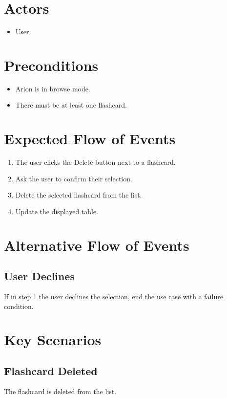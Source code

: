 \documentclass{scrreprt}
\begin{document}
\section{Actors}
\begin{itemize}
    \item User
\end{itemize}

\section{Preconditions}
\begin{itemize}
    \item Arion is in browse mode.
    \item There must be at least one flashcard.
\end{itemize}

\section{Expected Flow of Events}
\begin{enumerate}[1.]
    \item The user clicks the Delete button next to a flashcard.
    \item Ask the user to confirm their selection.
    \item Delete the selected flashcard from the list.
    \item Update the displayed table.
\end{enumerate}

\section{Alternative Flow of Events}

    \subsection{User Declines}
    If in step 1 the user declines the selection,
    end the use case with a failure condition.

\section{Key Scenarios}
    \subsection{Flashcard Deleted}
    The flashcard is deleted from the list.
\end{document}
